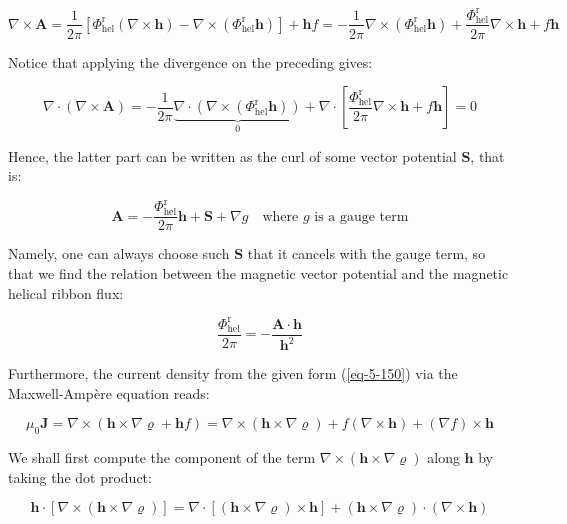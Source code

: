 \begin{equation}
    \nabla\times\mathbf{A}=\frac{1}{2\pi}\left[\Phi_\text{hel}^\text{r}(\nabla\times\mathbf{h})-\nabla\times(\Phi_\text{hel}^\text{r}\mathbf{h})\right]+\mathbf{h}f=-\frac{1}{2\pi}\nabla\times(\Phi_\text{hel}^\text{r}\mathbf{h})+\frac{\Phi_\text{hel}^\text{r}}{2\pi}\nabla\times\mathbf{h}+f\mathbf{h}
\end{equation}

Notice that applying the divergence on the preceding gives:

\begin{equation}
    \nabla\cdot(\nabla\times\mathbf{A})=-\frac{1}{2\pi}\underbrace{\nabla\cdot(\nabla\times(\Phi_\text{hel}^\text{r}\mathbf{h}))}_{0}+\nabla\cdot\left[\frac{\Phi_\text{hel}^\text{r}}{2\pi}\nabla\times\mathbf{h}+f\mathbf{h}\right]=0
\end{equation}

Hence, the latter part can be written as the curl of some vector potential $\mathbf{S}$, that is:

\begin{equation}
    \mathbf{A}=-\frac{\Phi_\text{hel}^\text{r}}{2\pi}\mathbf{h}+\mathbf{S}+\nabla g\quad\text{where }g\text{ is a gauge term}
\end{equation}

Namely, one can always choose such $\mathbf{S}$ that it cancels with the gauge term, so that we find the relation between the magnetic vector potential and the magnetic helical ribbon flux:

\begin{equation}
    \frac{\Phi_\text{hel}^\text{r}}{2\pi}=-\frac{\mathbf{A}\cdot\mathbf{h}}{\mathbf{h}^2}
\end{equation}

Furthermore, the current density from the given form (\ref{eq-5-150}) via the Maxwell-Ampère equation reads:

\begin{equation}
    \mu_0\mathbf{J}=\nabla\times\left(\mathbf{h}\times\nabla\varrho+\mathbf{h} f\right)=\nabla\times(\mathbf{h}\times\nabla\varrho)+f(\nabla\times\mathbf{h})+(\nabla f)\times\mathbf{h}
\end{equation}

We shall first compute the component of the term $\nabla\times(\mathbf{h}\times\nabla\varrho)$ along $\mathbf{h}$ by taking the dot product:

\begin{equation}
    \mathbf{h}\cdot[\nabla\times(\mathbf{h}\times\nabla\varrho)]=\nabla\cdot\left[(\mathbf{h}\times\nabla\varrho)\times\mathbf{h}\right]+(\mathbf{h}\times\nabla\varrho)\cdot(\nabla\times\mathbf{h})
\end{equation}

